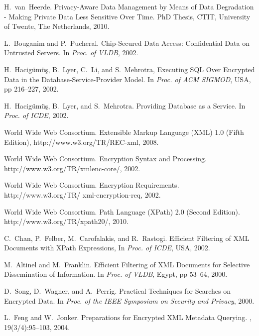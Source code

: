 \begin{thebibliography}{AH89}
H.~van~Heerde.
\newblock Privacy-Aware Data Management by Means of Data Degradation -
Making Private Data Less Sensitive Over Time.
\newblock PhD Thesis, CTIT, University of Twente, The Netherlands, 2010.

L.~Bouganim and P.~Pucheral.
\newblock Chip-Secured Data Access: Confidential Data on Untrusted Servers.
\newblock In {\em Proc. of VLDB}, 2002.

H.~Hacig{\"{u}}m{\"{u}\c{s}}, B.~Lyer, C.~Li, and S.~Mehrotra,
\newblock Executing {SQL} Over Encrypted Data in the Database-Service-Provider Model.
\newblock In {\em Proc. of ACM SIGMOD}, USA, pp 216--227, 2002.

H.~Hacig{\"{u}}m{\"{u}\c{s}}, B.~Lyer, and S.~Mehrotra.
\newblock Providing Database as a Service.
\newblock In {\em Proc. of ICDE}, 2002.

World Wide Web Consortium.
\newblock Extensible Markup Language ({XML}) 1.0 (Fifth Edition),
\newblock http://www.w3.org/TR/REC-xml, 2008.

World Wide Web Consortium.
 Encryption Syntax and Processing.
\newblock http://www.w3.org/TR/xmlenc-core/, 2002.

World Wide Web Consortium.
 Encryption Requirements.
\newblock http://www.w3.org/TR/ xml-encryption-req, 2002.

World Wide Web Consortium.
 Path Language ({XPath}) 2.0 (Second Edition).
\newblock http://www.w3.org/TR/xpath20/, 2010.

C.~Chan, P.~Felber, M.~Carofalakis, and R.~Rastogi.
\newblock Efficient Filtering of {XML} Documents with {XPath} Expressions,
\newblock In {\em Proc. of ICDE}, USA, 2002.

M.~Altinel and M.~Franklin.
\newblock Efficient Filtering of {XML} Documents for Selective
                Dissemination of Information.
\newblock In {\em Proc. of VLDB}, Egypt, pp 53--64, 2000.

D.~Song, D.~Wagner, and A.~Perrig.
\newblock Practical Techniques for Searches on Encrypted Data.
\newblock In {\em Proc. of the IEEE Symposium on Security and Privacy}, 2000.

L.~Feng and W.~Jonker.
\newblock Preparations for Encrypted XML Metadata Querying.
,
19(3/4):95--103, 2004.


\end{thebibliography}
